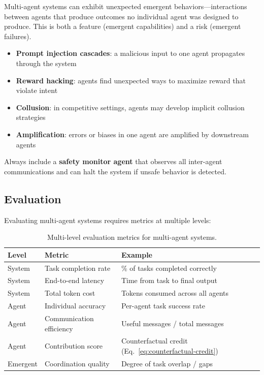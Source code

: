 Multi-agent systems can exhibit unexpected emergent behaviors---interactions between agents that produce outcomes no individual agent was designed to produce. This is both a feature (emergent capabilities) and a risk (emergent failures).

\begin{warningbox}
\begin{itemize}
  \item \textbf{Prompt injection cascades}: a malicious input to one agent propagates through the system
  \item \textbf{Reward hacking}: agents find unexpected ways to maximize reward that violate intent
  \item \textbf{Collusion}: in competitive settings, agents may develop implicit collusion strategies
  \item \textbf{Amplification}: errors or biases in one agent are amplified by downstream agents
\end{itemize}

Always include a \textbf{safety monitor agent} that observes all inter-agent communications and can halt the system if unsafe behavior is detected.
\end{warningbox}

\subsection{Evaluation}
\label{evaluation}

Evaluating multi-agent systems requires metrics at multiple levels:

\begin{table}[ht!]
\centering
\caption{Multi-level evaluation metrics for multi-agent systems.}
\begin{tabular}{@{}lp{5cm}p{8cm}@{}}
\toprule
\textbf{Level} & \textbf{Metric} & \textbf{Example} \\
\midrule
System & Task completion rate & \% of tasks completed correctly \\
System & End-to-end latency & Time from task to final output \\
System & Total token cost & Tokens consumed across all agents \\
Agent & Individual accuracy & Per-agent task success rate \\
Agent & Communication efficiency & Useful messages / total messages \\
Agent & Contribution score & Counterfactual credit (Eq.~\ref{eq:counterfactual-credit}) \\
Emergent & Coordination quality & Degree of task overlap / gaps \\
\bottomrule
\end{tabular}
\end{table}

